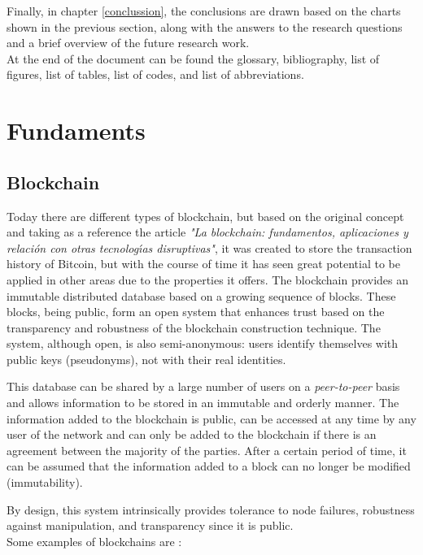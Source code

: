 \documentclass[MSE,Master,english]{twbook}%
\begin{document}
Finally, in chapter \ref{conclussion}, the conclusions are drawn based on the charts shown in the previous section, along with the answers to the research questions and a brief overview of the future research work. \\

At the end of the document can be found the glossary, bibliography, list of figures, list of tables, list of codes, and list of abbreviations.
\clearpage

\chapter{Fundaments\label{basics}}
\section{Blockchain}
Today there are different types of blockchain, but based on the original concept and taking as a reference the article \emph{"La blockchain: fundamentos, aplicaciones y relaci{\'o}n con otras tecnolog{\'\i}as disruptivas"}\cite{blockchain}, it was created to store the transaction history of Bitcoin, but with the course of time it has seen great potential to be applied in other areas due to the properties it offers. The blockchain provides an immutable distributed database based on a growing sequence of blocks. These blocks, being public, form an open system that enhances trust based on the transparency and robustness of the blockchain construction technique. The system, although open, is also semi-anonymous: users identify themselves with public keys (pseudonyms), not with their real identities.

This database can be shared by a large number of users on a \emph{peer-to-peer} basis and allows information to be stored in an immutable and orderly manner. The information added to the blockchain is public, can be accessed at any time by any user of the network and can only be added to the blockchain if there is an agreement between the majority of the parties. After a certain period of time, it can be assumed that the information added to a block can no longer be modified (immutability).

By design, this system intrinsically provides tolerance to node failures, robustness against manipulation, and transparency since it is public. \\

Some examples of blockchains are \cite{blockchainDummies}:
\end{document}
